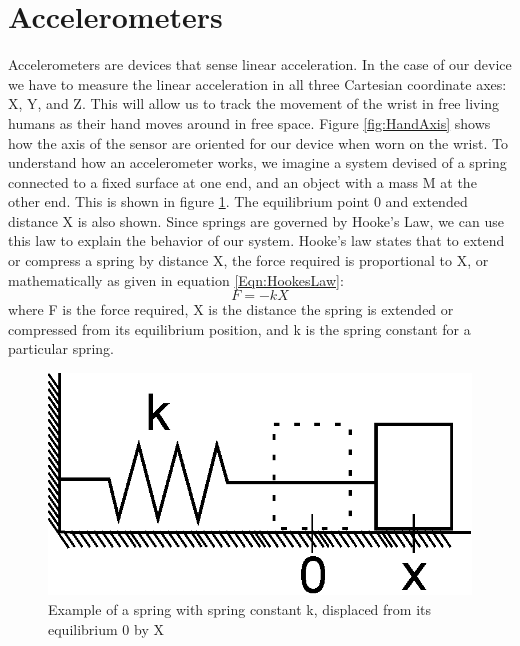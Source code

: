 \section{Accelerometers}
\label{Sec:Accelerometer}
Accelerometers are devices that sense linear acceleration.
In the case of our device we have to measure the linear acceleration in all three Cartesian coordinate axes: X, Y, and Z.
This will allow us to track the movement of the wrist in free living humans as their hand moves around in free space.
Figure \ref{fig:HandAxis} shows how the axis of the sensor are oriented for our device when worn on the wrist.
To understand how an accelerometer works,
we imagine a system devised of a spring connected to a fixed surface at one end,
and an object with a mass M at the other end. This is shown in figure \ref{fig:HookeSpring}.
The equilibrium point 0 and extended distance X is also shown.
Since springs are governed by Hooke's Law, we can use this law to explain the behavior of our system.
Hooke's law states that to extend or compress a spring by distance X,
the force required is proportional to X, or mathematically as given in equation \ref{Eqn:HookesLaw}:
\begin{equation}
\label{Eqn:HookesLaw}
F = -kX 
\end{equation}
where F is the force required, X is the distance the spring is extended or compressed from its equilibrium position, and k is the spring constant for a particular spring.
\begin{figure}
\begin{center}
\includegraphics{images/HookesLaw.eps}
\caption{Example of a spring with spring constant k, displaced from its equilibrium 0 by X}
\label{fig:HookeSpring}
\end{center}
\end{figure}

